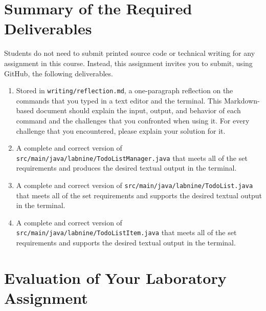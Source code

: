 \documentclass[11pt]{article}
\newcommand{\mainprogramsource}{\lstinline{src/main/java/labnine/TodoListManager.java}}
\newcommand{\secondprogramsource}{\lstinline{src/main/java/labnine/TodoList.java}}
\newcommand{\thirdprogramsource}{\lstinline{src/main/java/labnine/TodoListItem.java}}
\newcommand{\reflection}{\lstinline{writing/reflection.md}}
\begin{document}
\section*{Summary of the Required Deliverables}

\noindent Students do not need to submit printed source code or technical
writing for any assignment in this course. Instead, this assignment invites you
to submit, using GitHub, the following deliverables.

\begin{enumerate}

  \setlength{\itemsep}{0in}

\item Stored in \reflection{}, a one-paragraph reflection on the commands that
  you typed in a text editor and the terminal. This Markdown-based document
  should explain the input, output, and behavior of each command and the
  challenges that you confronted when using it. For every challenge that you
  encountered, please explain your solution for it.

\item A complete and correct version of \mainprogramsource{} that meets all of
  the set requirements and produces the desired textual output in the terminal.

\item A complete and correct version of \secondprogramsource{} that meets all of
  the set requirements and supports the desired textual output in the terminal.

\item A complete and correct version of \thirdprogramsource{} that meets all of
  the set requirements and supports the desired textual output in the terminal.


\end{enumerate}

\section*{Evaluation of Your Laboratory Assignment}
\end{document}
